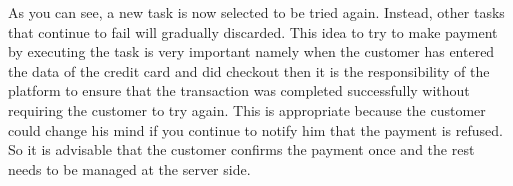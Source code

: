 \begin{itemize}
As you can see, a new task is now selected to be tried again. Instead, other tasks that continue to fail will gradually discarded.
\newline
This idea to try to make payment by executing the task is very important namely when the customer has entered the data of the credit card and did checkout then it is the responsibility of the platform to ensure that the transaction was completed successfully without requiring the customer to try again.
\newline
This is appropriate because the customer could change his mind if you continue to notify him that the payment is refused. So it is advisable that the customer confirms the payment once and the rest needs to be managed at the server side.
\end{itemize}